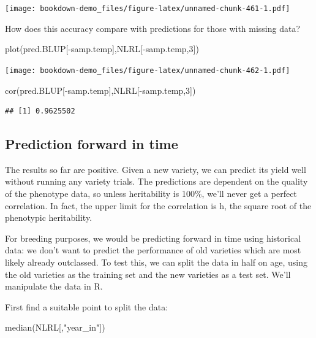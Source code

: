 \documentclass[
]{book}
\newenvironment{Shaded}{\begin{snugshade}}{\end{snugshade}}
\newcommand{\DecValTok}[1]{\textcolor[rgb]{0.00,0.00,0.81}{#1}}
\newcommand{\FunctionTok}[1]{\textcolor[rgb]{0.00,0.00,0.00}{#1}}
\newcommand{\NormalTok}[1]{#1}
\newcommand{\SpecialCharTok}[1]{\textcolor[rgb]{0.00,0.00,0.00}{#1}}
\newcommand{\StringTok}[1]{\textcolor[rgb]{0.31,0.60,0.02}{#1}}
\begin{document}
\texttt{[image: bookdown-demo\_files/figure-latex/unnamed-chunk-461-1.pdf]}

How does this accuracy compare with predictions for those with missing data?

\begin{Shaded}
\begin{Highlighting}[]
\FunctionTok{plot}\NormalTok{(pred.BLUP[}\SpecialCharTok{{-}}\NormalTok{samp.temp],NLRL[}\SpecialCharTok{{-}}\NormalTok{samp.temp,}\DecValTok{3}\NormalTok{])}
\end{Highlighting}
\end{Shaded}

\texttt{[image: bookdown-demo\_files/figure-latex/unnamed-chunk-462-1.pdf]}

\begin{Shaded}
\begin{Highlighting}[]
\FunctionTok{cor}\NormalTok{(pred.BLUP[}\SpecialCharTok{{-}}\NormalTok{samp.temp],NLRL[}\SpecialCharTok{{-}}\NormalTok{samp.temp,}\DecValTok{3}\NormalTok{])}
\end{Highlighting}
\end{Shaded}

\begin{verbatim}
## [1] 0.9625502
\end{verbatim}

\hypertarget{prediction-forward-in-time}{%
\subsection{Prediction forward in time}\label{prediction-forward-in-time}}

The results so far are positive. Given a new variety, we can predict its yield well without running any variety trials. The predictions are dependent on the quality of the phenotype data, so unless heritability is 100\%, we'll never get a perfect correlation. In fact, the upper limit for the correlation is h, the square root of the phenotypic heritability.

For breeding purposes, we would be predicting forward in time using historical data: we
don't want to predict the performance of old varieties which are most likely already
outclassed. To test this, we can split the data in half on age, using the old varieties as the training set and the new varieties as a test set. We'll manipulate the data in R.

First find a suitable point to split the data:

\begin{Shaded}
\begin{Highlighting}[]
\FunctionTok{median}\NormalTok{(NLRL[,}\StringTok{"year\_in"}\NormalTok{])}
\end{Highlighting}
\end{Shaded}
\end{document}
